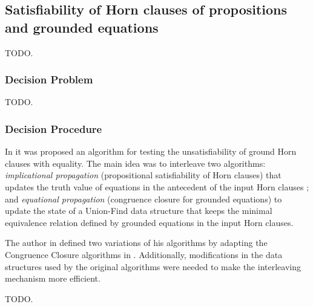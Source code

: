\subsection{Satisfiability of Horn clauses of propositions and grounded equations}

TODO.

\subsubsection{Decision Problem}

TODO.

\subsubsection{Decision Procedure}

In \cite{GALLIER1987233} it was proposed an algorithm 
for testing the unsatisfiability
of ground Horn clauses with equality. The main idea was 
to interleave two algorithms: \emph{implicational propagation}
(propositional satisfiability of Horn clauses) that 
updates the truth value of equations in the antecedent 
of the input Horn clauses \cite{DOWLING1984267}; and 
\emph{equational propagation} (congruence closure for 
grounded equations) to update the state of a 
Union-Find data structure \cite{10.1145/364099.364331}
that keeps the minimal equivalence relation defined 
by grounded equations in the input Horn clauses.

The author in \cite{GALLIER1987233} defined two 
variations of his algorithms by adapting
the Congruence Closure algorithms in 
\cite{10.1145/322217.322228, 10.1145/322186.322198}.
Additionally, modifications in the data structures 
used by the original algorithms were needed
to make the interleaving mechanism more efficient.

TODO.


